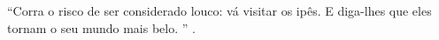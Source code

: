 \begin{epigrafe}%

``Corra o risco de ser considerado louco: vá visitar os ipês. E diga-lhes que eles tornam o seu mundo mais belo. ''  \cite{alves2008}.

\end{epigrafe}
